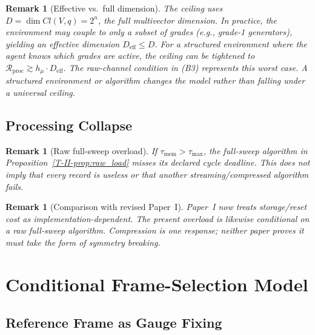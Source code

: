 \documentclass[12pt,a4paper,openany]{book}
\newtheorem{remark}[theorem]{Remark}
\begin{document}
\begin{remark}[Effective vs.\ full dimension]
\label{T-II-rem:D_eff}
The ceiling uses $D = \dim Cl(V,q) = 2^n$, the full
multivector dimension.
In practice, the environment may couple to only a subset of
grades (e.g., grade-1 generators), yielding an effective
dimension $D_{\mathrm{eff}} \leq D$.
For a \emph{structured} environment where the agent knows
which grades are active, the ceiling can be tightened to
$\mathcal{R}_{\mathrm{proc}} \gtrsim h_\mu
\cdot D_{\mathrm{eff}}$.
The raw-channel condition in (B3) represents this worst case.  A
structured environment or algorithm changes the model rather than
falling under a universal ceiling.
\end{remark}

\subsection{Processing Collapse}
\label{T-II-subsec:collapse}

\begin{remark}[Raw full-sweep overload]
\label{T-II-rem:raw_overload}
If $\tau_{\mathrm{mem}}>\tau_{\max}$, the full-sweep algorithm in
Proposition~\ref{T-II-prop:raw_load} misses its declared cycle deadline.
This does not imply that every record is useless or that another
streaming/compressed algorithm fails.
\end{remark}

\begin{remark}[Comparison with revised Paper~I]
\label{T-II-rem:comparison}
Paper~I now treats storage/reset cost as implementation-dependent.  The
present overload is likewise conditional on a raw full-sweep algorithm.
Compression is one response; neither paper proves it must take the form
of symmetry breaking.
\end{remark}

\section{Conditional Frame-Selection Model}
\label{T-II-sec:breaking}

\subsection{Reference Frame as Gauge Fixing}
\label{T-II-subsec:frame}
\end{document}
